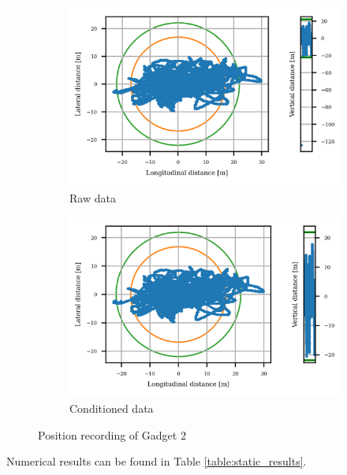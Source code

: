 \documentclass{article}
\begin{document}
			\begin{figure}[h]
		   		\centering
		     	\begin{subfigure}[b]{0.45\textwidth}
		      		\centering
		      	  	\includegraphics[width=\textwidth]{Static/raw_static_MTK 3339.png}
		      	  	\caption{Raw data}
		     	\end{subfigure}
		     	\begin{subfigure}[b]{0.45\textwidth}
		      	   \centering
		      	   \includegraphics[width=\textwidth]{Static/cond_static_MTK 3339.png}
		      	   \caption{Conditioned data}
		     	\end{subfigure}
		      \caption{Position recording of Gadget 2}
		      \label{fig:static_loc_gadget2}
			\end{figure}	
			Numerical results can be found in Table \ref{table:static_results}.
\end{document}
